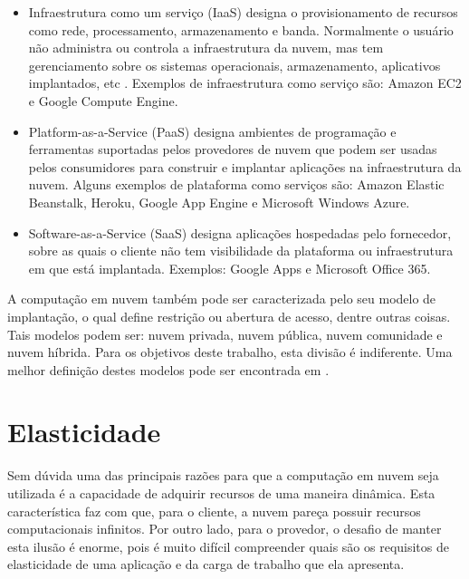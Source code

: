 \documentclass[twoside,english,brazilian]{UNISINOSmonografia}
\begin{document}
\begin{itemize}
	\item Infraestrutura como um serviço (IaaS) designa o provisionamento de recursos como rede, processamento, armazenamento e banda. Normalmente o usuário não administra ou controla a infraestrutura da nuvem, mas tem gerenciamento sobre os sistemas operacionais, armazenamento, aplicativos implantados, etc . Exemplos de infraestrutura como serviço são: Amazon EC2 e Google Compute Engine.
	\item Platform-as-a-Service (PaaS) designa ambientes de programação e ferramentas suportadas pelos provedores de nuvem que podem ser usadas pelos consumidores para construir e implantar aplicações na infraestrutura da nuvem. Alguns exemplos de plataforma como serviços são: Amazon Elastic Beanstalk, Heroku, Google App Engine e Microsoft Windows Azure.
	\item Software-as-a-Service (SaaS) designa aplicações hospedadas pelo fornecedor, sobre as quais o cliente não tem visibilidade da plataforma ou infraestrutura em que está implantada. Exemplos: Google Apps e Microsoft Office 365.
\end{itemize}

A computação em nuvem também pode ser caracterizada pelo seu modelo de implantação, o qual define restrição ou abertura de acesso, dentre outras coisas. Tais modelos podem ser: nuvem privada, nuvem pública, nuvem comunidade e nuvem híbrida. Para os objetivos deste trabalho, esta divisão é indiferente. Uma melhor definição destes modelos pode ser encontrada em \citep{coutinho}.

\section{Elasticidade}

Sem dúvida uma das principais razões para que a computação em nuvem seja utilizada é a capacidade de adquirir recursos de uma maneira dinâmica. Esta característica faz com que, para o cliente, a nuvem pareça possuir recursos computacionais infinitos. Por outro lado, para o provedor, o desafio de manter esta ilusão é enorme, pois é muito difícil compreender quais são os requisitos de elasticidade de uma aplicação e da carga de trabalho que ela apresenta.
\end{document}
